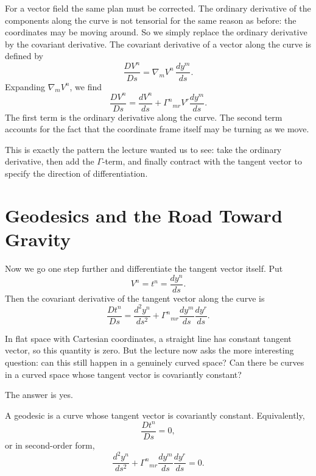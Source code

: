 For a vector field the same plan must be corrected. The ordinary derivative of the components along the curve is not tensorial for the same reason as before: the coordinates may be moving around. So we simply replace the ordinary derivative by the covariant derivative. The covariant derivative of a vector along the curve is defined by
\begin{equation}
\frac{D V^n}{Ds}
=
\nabla_m V^n\,\frac{dy^m}{ds}.
\end{equation}
Expanding \(\nabla_m V^n\), we find
\begin{equation}
\frac{D V^n}{Ds}
=
\frac{dV^n}{ds}
+
\Gamma^n{}_{mr}V^r\frac{dy^m}{ds}.
\end{equation}
The first term is the ordinary derivative along the curve. The second term accounts for the fact that the coordinate frame itself may be turning as we move.

This is exactly the pattern the lecture wanted us to see: take the ordinary derivative, then add the \(\Gamma\)-term, and finally contract with the tangent vector to specify the direction of differentiation.

\section{Geodesics and the Road Toward Gravity}

Now we go one step further and differentiate the tangent vector itself. Put
\begin{equation}
V^n=t^n=\frac{dy^n}{ds}.
\end{equation}
Then the covariant derivative of the tangent vector along the curve is
\begin{equation}
\frac{D t^n}{Ds}
=
\frac{d^2 y^n}{ds^2}
+
\Gamma^n{}_{mr}\frac{dy^m}{ds}\frac{dy^r}{ds}.
\end{equation}

In flat space with Cartesian coordinates, a straight line has constant tangent vector, so this quantity is zero. But the lecture now asks the more interesting question: can this still happen in a genuinely curved space? Can there be curves in a curved space whose tangent vector is covariantly constant?

The answer is yes.

\begin{definition}
A geodesic is a curve whose tangent vector is covariantly constant. Equivalently,
\begin{equation}
\frac{D t^n}{Ds}=0,
\end{equation}
or in second-order form,
\begin{equation}
\frac{d^2 y^n}{ds^2}
+
\Gamma^n{}_{mr}\frac{dy^m}{ds}\frac{dy^r}{ds}
=
0.
\end{equation}
\end{definition}

